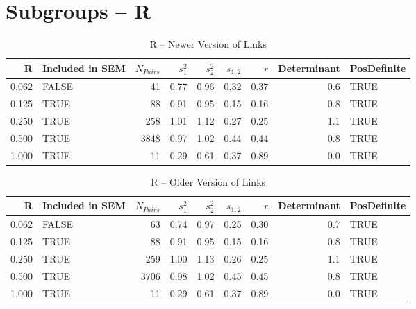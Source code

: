 \documentclass{article}\usepackage[]{graphicx}\usepackage[]{color}
\begin{document}
\section{Subgroups --  R }%
\begin{table}[ht]
\centering
\begin{tabular}{rlrrrrrrl}
  \hline
R & Included in SEM & $N_{Pairs}$ & $s_1^2$ & $s_2^2$ & $s_{1,2}$ & $r$ & Determinant & PosDefinite \\ 
  \hline
0.062 & FALSE & 41 & 0.77 & 0.96 & 0.32 & 0.37 & 0.6 & TRUE \\ 
  0.125 & TRUE & 88 & 0.91 & 0.95 & 0.15 & 0.16 & 0.8 & TRUE \\ 
  0.250 & TRUE & 258 & 1.01 & 1.12 & 0.27 & 0.25 & 1.1 & TRUE \\ 
  0.500 & TRUE & 3848 & 0.97 & 1.02 & 0.44 & 0.44 & 0.8 & TRUE \\ 
  1.000 & TRUE & 11 & 0.29 & 0.61 & 0.37 & 0.89 & 0.0 & TRUE \\ 
   \hline
\end{tabular}
\caption{R -- Newer Version of Links} 
\end{table}
\begin{table}[ht]
\centering
\begin{tabular}{rlrrrrrrl}
  \hline
R & Included in SEM & $N_{Pairs}$ & $s_1^2$ & $s_2^2$ & $s_{1,2}$ & $r$ & Determinant & PosDefinite \\ 
  \hline
0.062 & FALSE & 63 & 0.74 & 0.97 & 0.25 & 0.30 & 0.7 & TRUE \\ 
  0.125 & TRUE & 88 & 0.91 & 0.95 & 0.15 & 0.16 & 0.8 & TRUE \\ 
  0.250 & TRUE & 259 & 1.00 & 1.13 & 0.26 & 0.25 & 1.1 & TRUE \\ 
  0.500 & TRUE & 3706 & 0.98 & 1.02 & 0.45 & 0.45 & 0.8 & TRUE \\ 
  1.000 & TRUE & 11 & 0.29 & 0.61 & 0.37 & 0.89 & 0.0 & TRUE \\ 
   \hline
\end{tabular}
\caption{R -- Older Version of Links} 
\end{table}
\newpage 
\end{document}
